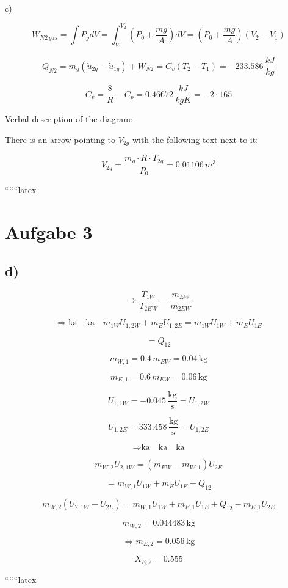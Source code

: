 \noindent
c) 

\[
W_{N2 \, gas} = \int P_g dV = \int_{V_1}^{V_2} \left( P_0 + \frac{mg}{A} \right) dV = (P_0 + \frac{mg}{A})(V_2 - V_1)
\]

\[
Q_{N2} = m_g (\dot{u}_{2g} - \dot{u}_{1g}) + W_{N2} = C_v (T_2 - T_1) = -233.586 \, \frac{kJ}{kg}
\]

\[
C_v = \frac{8}{R} - C_p = 0.46672 \, \frac{kJ}{kgK} = -2 \cdot 165
\]

\noindent
Verbal description of the diagram:

There is an arrow pointing to \( V_{2g} \) with the following text next to it:

\[
V_{2g} = \frac{m_g \cdot R \cdot T_{2g}}{P_0} = 0.01106 \, m^3
\]

``````latex


\section*{Aufgabe 3}

\subsection*{d)}

\[
\Rightarrow \frac{T_{1W}}{T_{2EW}} = \frac{m_{EW}}{m_{2EW}}
\]

\[
\Rightarrow \text{ka} \quad \text{ka} \quad m_{1W} U_{1,2W} + m_{E} U_{1,2E} = m_{1W} U_{1W} + m_{E} U_{1E}
\]

\[
= Q_{12}
\]

\[
m_{W,1} = 0.4 \, m_{EW} = 0.04 \, \text{kg}
\]

\[
m_{E,1} = 0.6 \, m_{EW} = 0.06 \, \text{kg}
\]

\[
U_{1,1W} = -0.045 \, \frac{\text{kg}}{\text{s}} = U_{1,2W}
\]

\[
U_{1,2E} = 333.458 \, \frac{\text{kg}}{\text{s}} = U_{1,2E}
\]

\[
\Rightarrow \text{ka} \quad \text{ka} \quad \text{ka}
\]

\[
m_{W,2} U_{2,1W} = (m_{EW} - m_{W,1}) U_{2E}
\]

\[
= m_{W,1} U_{1W} + m_{E} U_{1E} + Q_{12}
\]

\[
m_{W,2} (U_{2,1W} - U_{2E}) = m_{W,1} U_{1W} + m_{E,1} U_{1E} + Q_{12} - m_{E,1} U_{2E}
\]

\[
m_{W,2} = 0.044483 \, \text{kg}
\]

\[
\Rightarrow m_{E,2} = 0.056 \, \text{kg}
\]

\[
X_{E,2} = 0.555
\]

``````latex


